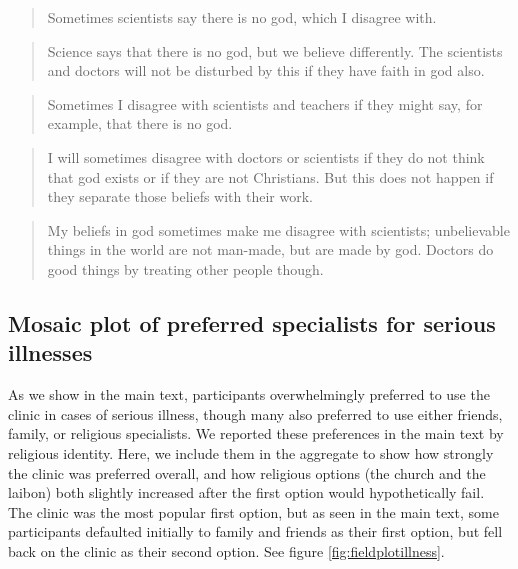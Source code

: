 \documentclass[
]{article}
\begin{document}
\begin{quote}
Sometimes scientists say there is no god, which I disagree with.
\end{quote}

\begin{quote}
Science says that there is no god, but we believe differently. The scientists and doctors will not be disturbed by this if they have faith in god also.
\end{quote}

\begin{quote}
Sometimes I disagree with scientists and teachers if they might say, for example, that there is no god.
\end{quote}

\begin{quote}
I will sometimes disagree with doctors or scientists if they do not think that god exists or if they are not Christians. But this does not happen if they separate those beliefs with their work.
\end{quote}

\begin{quote}
My beliefs in god sometimes make me disagree with scientists; unbelievable things in the world are not man-made, but are made by god. Doctors do good things by treating other people though.
\end{quote}

\hypertarget{mosaic-plot-of-preferred-specialists-for-serious-illnesses}{%
\subsection{Mosaic plot of preferred specialists for serious illnesses}\label{mosaic-plot-of-preferred-specialists-for-serious-illnesses}}

As we show in the main text, participants overwhelmingly preferred to use the clinic in cases of serious illness, though many also preferred to use either friends, family, or religious specialists. We reported these preferences in the main text by religious identity. Here, we include them in the aggregate to show how strongly the clinic was preferred overall, and how religious options (the church and the laibon) both slightly increased after the first option would hypothetically fail. The clinic was the most popular first option, but as seen in the main text, some participants defaulted initially to family and friends as their first option, but fell back on the clinic as their second option. See figure \ref{fig:fieldplotillness}.
\end{document}
